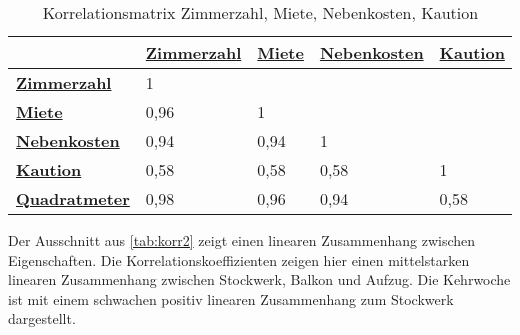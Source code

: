 \useunder{\uline}{\ul}{}
\begin{table}[h]
    \begin{center}
        \begin{tabular}{|l|l|l|l|l|}
            \hline
            {\ul \textbf{}}             & {\ul \textbf{Zimmerzahl}} & {\ul \textbf{Miete}} & {\ul \textbf{Nebenkosten}} & {\ul \textbf{Kaution}} \\ \hline
            {\ul \textbf{Zimmerzahl}}   & 1                         &                      &                            &                        \\ \hline
            {\ul \textbf{Miete}}        & 0,96                      & 1                    &                            &                        \\ \hline
            {\ul \textbf{Nebenkosten}}  & 0,94                      & 0,94                 & 1                          &                        \\ \hline
            {\ul \textbf{Kaution}}      & 0,58                      & 0,58                 & 0,58                       & 1                      \\ \hline
            {\ul \textbf{Quadratmeter}} & 0,98                      & 0,96                 & 0,94                       & 0,58                   \\ \hline
        \end{tabular}
        \caption{Korrelationsmatrix Zimmerzahl, Miete, Nebenkosten, Kaution}
        \label{tab:korr1}
    \end{center}
\end{table}

Der Ausschnitt aus \autoref{tab:korr2} zeigt einen linearen Zusammenhang zwischen Eigenschaften. Die Korrelationskoeffizienten
zeigen hier einen mittelstarken linearen Zusammenhang zwischen Stockwerk, Balkon und Aufzug.
Die Kehrwoche ist mit einem schwachen positiv linearen Zusammenhang zum Stockwerk dargestellt.

